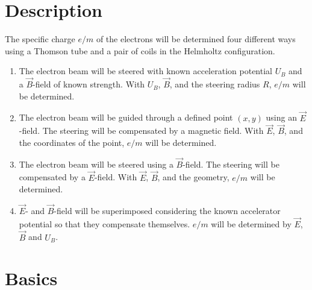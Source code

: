 \documentclass{tudphygp_eng}
\author{G.~Oertel,R.~Schwierz}
\begin{document}
\maketitle

\section{Description}
  The specific charge $e/m$ of the electrons will be determined four different ways using a Thomson tube and a pair of coils in the Helmholtz configuration.
  \begin{enumerate}
    \item The electron beam will be steered with known acceleration potential $U_B$ and a $\vec B$-field of known strength. With $U_B$, $\vec B$, and the steering radius $R$,  $e/m$ will be determined.
    \item The electron beam will be guided through a defined point $(x,y)$ using an $\vec E$-field. The steering will be compensated by a magnetic field. With $\vec E$, $\vec B$, and the coordinates of the point, $e/m$ will be determined.
    \item The electron beam will be steered using a $\vec B$-field. The steering will be compensated by a $\vec E$-field. With $\vec E$, $\vec B$, and the geometry, $e/m$ will be determined.
    \item $\vec E$- and $\vec B$-field will be superimposed considering the known accelerator potential so that they compensate themselves. $e/m$ will be determined by $\vec E$, $\vec B$ and $U_B$.
  \end{enumerate}

\section{Basics}
\end{document}
